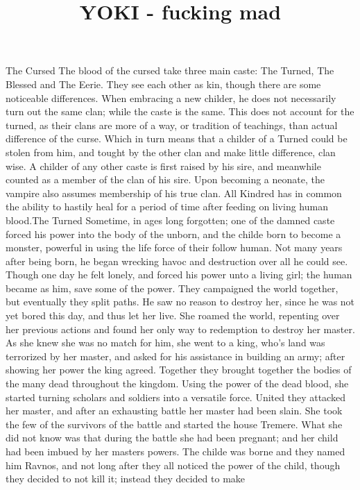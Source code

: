 \documentclass[10pt,a4paper]{article}
\author{}
\title{YOKI - fucking mad}
\date{}
\begin{document}
	\maketitle
	\pagebreak
	\setcounter{tocdepth}{3}
	\tableofcontents
	\pagebreak
The Cursed
The blood of the cursed take three main caste: The Turned, The Blessed and
The Eerie. They see each other as kin, though there are some noticeable
differences.
When embracing a new childer, he does not necessarily turn out the same
clan; while the caste is the same.
This does not account for the turned, as their clans are more of a way, or
tradition of teachings, than actual difference of the curse. Which in turn
means that a childer of a Turned could be stolen from him, and tought by
the other clan and make little difference, clan wise.
A childer of any other caste is first raised by his sire, and meanwhile
counted as a member of the clan of his sire. Upon becoming a neonate, the
vampire also assumes membership of his true clan.
All Kindred has in common the ability to hastily heal for a period of time
after feeding on living human blood.The Turned
Sometime, in ages long forgotten; one of the damned caste forced his power
into the body of the unborn, and the childe born to become a monster,
powerful in using the life force of their follow human. Not many years after
being born, he began wrecking havoc and destruction over all he could see.
Though one day he felt lonely, and forced his power unto a living girl; the
human became as him, save some of the power. They campaigned the world
together, but eventually they split paths. He saw no reason to destroy her,
since he was not yet bored this day, and thus let her live. She roamed the
world, repenting over her previous actions and found her only way to
redemption to destroy her master. As she knew she was no match for him,
she went to a king, who's land was terrorized by her master, and asked for
his assistance in building an army; after showing her power the king agreed.
Together they brought together the bodies of the many dead throughout the
kingdom. Using the power of the dead blood, she started turning scholars
and soldiers into a versatile force. United they attacked her master, and after
an exhausting battle her master had been slain. She took the few of the
survivors of the battle and started the house Tremere.
What she did not know was that during the battle she had been pregnant;
and her child had been imbued by her masters powers. The childe was borne
and they named him Ravnos, and not long after they all noticed the power
of the child, though they decided to not kill it; instead they decided to make
\end{document}
